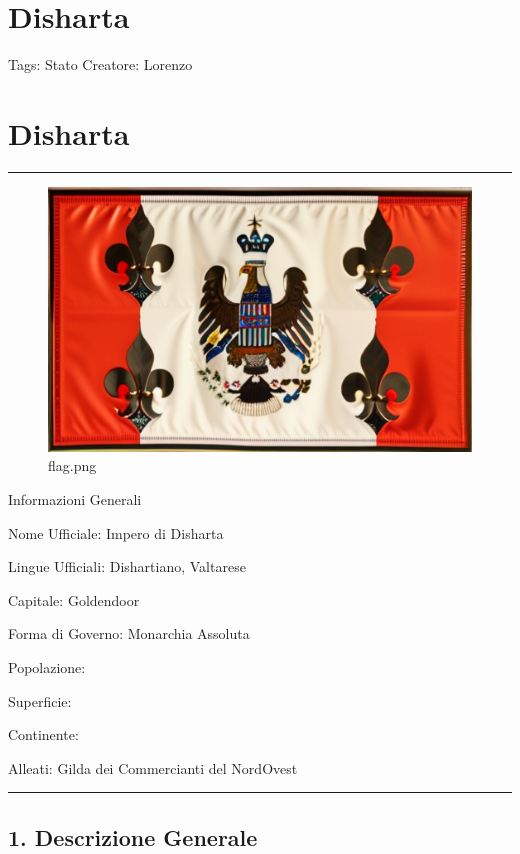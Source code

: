 \section{Disharta}\label{disharta}

Tags: Stato Creatore: Lorenzo

\section{Disharta}\label{disharta-1}

\begin{center}\rule{0.5\linewidth}{0.5pt}\end{center}

\begin{figure}
\centering
\includegraphics{flag.png}
\caption{flag.png}
\end{figure}

Informazioni Generali

Nome Ufficiale: Impero di Disharta

Lingue Ufficiali: Dishartiano, Valtarese

Capitale: Goldendoor

Forma di Governo: Monarchia Assoluta

Popolazione:

Superficie:

Continente:

Alleati: Gilda dei Commercianti del NordOvest

\begin{center}\rule{0.5\linewidth}{0.5pt}\end{center}

\subsection{1. Descrizione Generale}\label{descrizione-generale}

